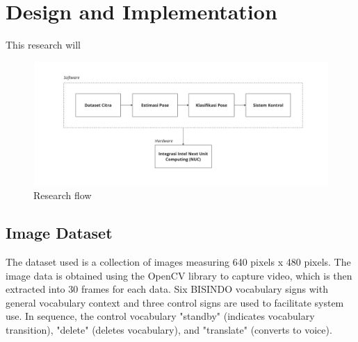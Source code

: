 
\section{Design and Implementation}
\label{sec:designandimplementation}

This research will 

\begin{figure}[ht]
  \centering
  \includegraphics[scale=0.1]{gambar/bab3-block-diagram-nuc.jpg}
  \caption{Research flow}
  \label{fig:blockdiagrammethod}
\end{figure}

\subsection{Image Dataset}
\label{subsec:imagedataset}

The dataset used is a collection of images measuring 640 pixels x 480 pixels. The image data is obtained using the OpenCV library to capture video, which is then extracted into 30 frames for each data. Six BISINDO vocabulary signs with general vocabulary context and three control signs are used to facilitate system use. In sequence, the control vocabulary "standby" (indicates vocabulary transition), "delete" (deletes vocabulary), and "translate" (converts to voice).

